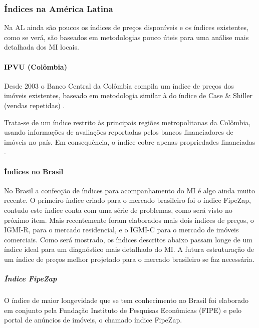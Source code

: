 \documentclass[
	12pt,				%
	oneside,			%
	a4paper,			%
	chapter=TITLE,		%
	section=TITLE,		%
	english,			%
	brazil				%
	]{abntex2}
\begin{document}
\begin{refsection}
\hypertarget{uxedndices-na-amuxe9rica-latina}{%
\subsubsection{Índices na América Latina}\label{uxedndices-na-amuxe9rica-latina}}

Na \gls{AL} ainda são poucos os índices de preços disponíveis e os índices
existentes, como se verá, são baseados em metodologias pouco úteis para uma
análise mais detalhada dos \gls{MI} locais.

\hypertarget{ipvu-coluxf4mbia}{%
\paragraph{IPVU (Colômbia)}\label{ipvu-coluxf4mbia}}

Desde 2003 o Banco Central da Colômbia compila um índice de preços
dos imóveis existentes, baseado em metodologia similar à do índice de
Case \& Shiller (vendas repetidas) \autocite[130]{rppi}.

Trata-se de um índice restrito às principais regiões metropolitanas da Colômbia,
usando informações de avaliações reportadas pelos bancos financiadores de
imóveis no país. Em consequência, o índice cobre apenas propriedades
financiadas \autocite[130]{rppi}.

\hypertarget{uxedndices-no-brasil}{%
\paragraph{Índices no Brasil}\label{uxedndices-no-brasil}}

No Brasil a confecção de índices para acompanhamento do \gls{MI} é algo ainda
muito recente. O primeiro índice criado para o mercado brasileiro foi o índice
FipeZap, contudo este índice conta com uma série de problemas, como será visto
no próximo item. Mais recentemente foram elaborados mais dois índices de preços,
o IGMI-R, para o mercado residencial, e o IGMI-C para o mercado de imóveis
comerciais. Como será mostrado, os índices descritos abaixo passam longe de
um índice ideal para um diagnóstico mais detalhado do \gls{MI}. A futura
estruturação de um índice de preços melhor projetado para o mercado brasileiro
se faz necessária.

\hypertarget{uxedndice-fipezap}{%
\subparagraph{Índice FipeZap}\label{uxedndice-fipezap}}

O índice de maior longevidade que se tem conhecimento no Brasil foi elaborado em
conjunto pela Fundação Instituto de Pesquisas Econômicas (FIPE) e pelo portal de
anúncios de imóveis, o chamado índice FipeZap.


\end{refsection}
\end{document}
